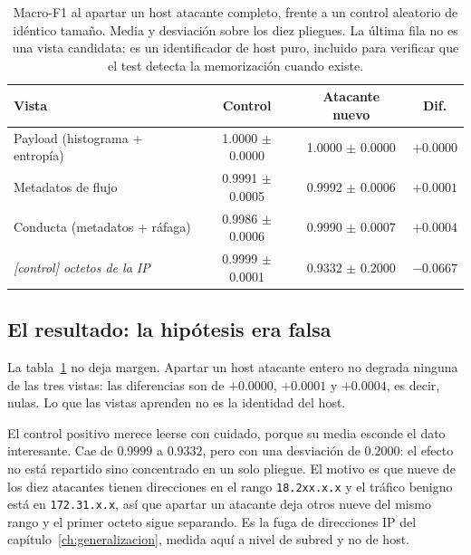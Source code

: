 \begin{table}[htbp]
  \centering
  \caption[Leave-one-attacker-out sobre el DDoS del 20-02]{Macro-F1 al apartar un
  host atacante completo, frente a un control aleatorio de idéntico tamaño.
  Media y desviación sobre los diez pliegues. La última fila no es una vista
  candidata: es un identificador de host puro, incluido para verificar que el
  test detecta la memorización cuando existe.}
  \label{tab:loao}
  \begin{tabular}{lccc}
    \toprule
    \textbf{Vista} & \textbf{Control} & \textbf{Atacante nuevo} & \textbf{Dif.} \\
    \midrule
    Payload (histograma + entropía) & 1.0000 $\pm$ 0.0000 & 1.0000 $\pm$ 0.0000 & $+0.0000$ \\
    Metadatos de flujo              & 0.9991 $\pm$ 0.0005 & 0.9992 $\pm$ 0.0006 & $+0.0001$ \\
    Conducta (metadatos + ráfaga)   & 0.9986 $\pm$ 0.0006 & 0.9990 $\pm$ 0.0007 & $+0.0004$ \\
    \midrule
    \emph{[control] octetos de la IP} & 0.9999 $\pm$ 0.0001 & 0.9332 $\pm$ 0.2000 & $-0.0667$ \\
    \bottomrule
  \end{tabular}
\end{table}

\subsection*{El resultado: la hipótesis era falsa}

La tabla~\ref{tab:loao} no deja margen. Apartar un host atacante entero no
degrada ninguna de las tres vistas: las diferencias son de $+0.0000$,
$+0.0001$ y $+0.0004$, es decir, nulas. Lo que las vistas aprenden no es la
identidad del host.

El control positivo merece leerse con cuidado, porque su media esconde el dato
interesante. Cae de $0.9999$ a $0.9332$, pero con una desviación de
$0.2000$: el efecto no está repartido sino concentrado en un solo
pliegue. El motivo es que nueve de los diez atacantes tienen direcciones en el
rango \texttt{18.2xx.x.x} y el tráfico benigno está en \texttt{172.31.x.x}, así
que apartar un atacante deja otros nueve del mismo rango y el primer octeto
sigue separando. Es la fuga de direcciones IP del
capítulo~\ref{ch:generalizacion}, medida aquí a nivel de subred y no de host.

